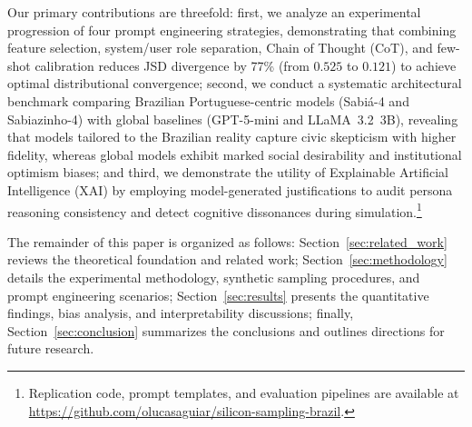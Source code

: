 Our primary contributions are threefold: first, we analyze an experimental
progression of four prompt engineering strategies, demonstrating that combining
feature selection, system/user role separation, Chain of Thought (CoT),
and few-shot calibration reduces JSD divergence by 77\% (from $0.525$ to $0.121$)
to achieve optimal distributional convergence; second, we conduct a systematic
architectural benchmark comparing Brazilian Portuguese-centric models
(Sabiá-4 and Sabiazinho-4) with global baselines (GPT-5-mini and LLaMA~3.2~3B),
revealing that models tailored to the Brazilian reality capture civic skepticism
with higher fidelity, whereas global models exhibit marked social desirability
and institutional optimism biases; and third, we demonstrate the utility of
Explainable Artificial Intelligence (XAI) by employing model-generated
justifications to audit persona reasoning consistency and detect cognitive
dissonances during simulation.\footnote{Replication code, prompt templates,
and evaluation pipelines are available at
\url{https://github.com/olucasaguiar/silicon-sampling-brazil}.}

The remainder of this paper is organized as follows: Section~\ref{sec:related_work}
reviews the theoretical foundation and related work; Section~\ref{sec:methodology}
details the experimental methodology, synthetic sampling procedures, and prompt
engineering scenarios; Section~\ref{sec:results} presents the quantitative
findings, bias analysis, and interpretability discussions; finally,
Section~\ref{sec:conclusion} summarizes the conclusions and outlines directions
for future research.
